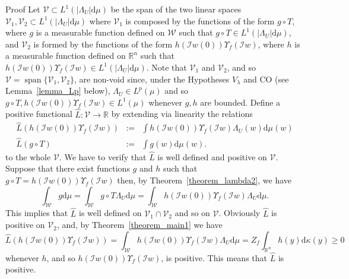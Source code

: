 \documentclass[a4paper,10pt]{article}
\newcommand{\assign}{:=}
\newcommand{\mathd}{\mathrm{d}}
\newcommand{\tmop}[1]{\ensuremath{\operatorname{#1}}}
\newenvironment{proof*}[1]{\noindent\textbf{#1\ }}{\hspace*{\fill}$\Box$\medskip}
\begin{document}
\begin{proof*}{Proof}
  Let $\mathcal{V} \subset L^1 (| \Lambda_U | \mathd \mu)$ be the span of the
  two linear spaces $\mathcal{V}_1, \mathcal{V}_2 \subset L^1 (| \Lambda_U |
  \mathd \mu)$ where $\mathcal{V}_1$ is composed by the functions of the form
  $g \circ T$, where $g$ is a measurable function defined on $\mathcal{W}$
  such that $g \circ T \in L^1 (| \Lambda_U | \mathd \mu)$, and
  $\mathcal{V}_2$ is formed by the functions of the form $h (\mathcal{I}w (0))
  \Upsilon_f (\mathcal{I}w)$, where $h$ is a measurable function defined on
  $\mathbb{R}^n$ such that $h (\mathcal{I}w (0)) \Upsilon_f (\mathcal{I}w) \in
  L^1 (| \Lambda_U | \mathd \mu)$. Note that $\mathcal{V}_1$ and
  $\mathcal{V}_2$, and so $\mathcal{V} = \tmop{span} \{ \mathcal{V}_1,
  \mathcal{V}_2 \}$, are non-void since, under the Hypotheses $V_{\lambda}$
  and CO (see Lemma~\ref{lemma_Lp} below), $\Lambda_U \in L^p (\mu)$ and so $g
  \circ T, h (\mathcal{I}w (0)) \Upsilon_f (\mathcal{I}w) \in L^1 (\mu)$
  whenever $g, h$ are bounded. Define a positive functional $\hat{L} :
  \mathcal{V} \rightarrow \mathbb{R}$ by extending via linearity the relations
  \begin{eqnarray}
    \hat{L} (h (\mathcal{I}w (0)) \Upsilon_f (\mathcal{I}w)) & \assign & \int
    h (\mathcal{I}w (0)) \Upsilon_f (\mathcal{I}w) \Lambda_U (w) \mathd \mu
    (w) \label{equationreduction2} \\
    \hat{L} (g \circ T) & \assign & \int g (w) \mathd \mu (w) .
    \label{equationreduction1} 
  \end{eqnarray}
  to the whole $\mathcal{V}$. We have to verify that $\hat{L}$ is well defined
  and positive on $\mathcal{V} .$ Suppose that there exist functions $g$ and
  $h$ such that $g \circ T = h (\mathcal{I}w (0)) \Upsilon_f (\mathcal{I}w)$
  then, by Theorem~\ref{theorem_lambda2}, we have
  \begin{equation}
    \int_{\mathcal{W}} g \mathd \mu = \int_{\mathcal{W}} g \circ T \Lambda_U
    \mathd \mu = \int_{\mathcal{W}} h (\mathcal{I}w (0)) \Upsilon_f
    (\mathcal{I}w) \Lambda_U \mathd \mu . \label{equationreduction4}
  \end{equation}
  This implies that $\hat{L}$ is well defined on $\mathcal{V}_1 \cap
  \mathcal{V}_2$ and so on $\mathcal{V}$. Obviously $\hat{L}$ is positive on
  $\mathcal{V}_2$, and, by Theorem~\ref{theorem_main1} we have
  \begin{equation}
    \hat{L} (h (\mathcal{I}w (0)) \Upsilon_f (\mathcal{I}w)) =
    \int_{\mathcal{W}} h (\mathcal{I}w (0)) \Upsilon_f (\mathcal{I}w)
    \Lambda_U \mathd \mu = Z_f \int_{\mathbb{R}^n} h (y) \mathd \kappa (y)
    \geqslant 0 \label{equationreduction3}
  \end{equation}
  whenever $h$, and so $h (\mathcal{I}w (0)) \Upsilon_f (\mathcal{I}w)$, is
  positive. This means that $\hat{L}$ is positive.
  

\end{proof*}
\end{document}
